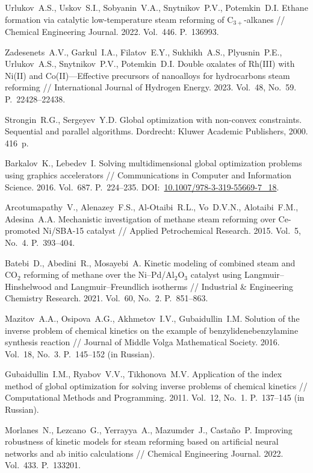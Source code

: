 \documentclass{cmi}
\begin{document}
\begin{biblio_lat}
Urlukov~A.S., Uskov~S.I., Sobyanin~V.A., Snytnikov~P.V., Potemkin~D.I. Ethane formation via catalytic low-temperature steam reforming of C$_{3+}$-alkanes // Chemical Engineering Journal. 2022. Vol.~446. P.~136993.

Zadesenets~A.V., Garkul~I.A., Filatov~E.Y., Sukhikh~A.S., Plyusnin~P.E., Urlukov~A.S., Snytnikov~P.V., Potemkin~D.I. Double oxalates of Rh(III) with Ni(II) and Co(II)---Effective precursors of nanoalloys for hydrocarbons steam reforming // International Journal of Hydrogen Energy. 2023. Vol.~48, No.~59. P.~22428--22438.

Strongin~R.G., Sergeyev~Y.D. Global optimization with non-convex constraints. Sequential and parallel algorithms. Dordrecht: Kluwer Academic Publishers, 2000. 416~p.

Barkalov~K., Lebedev~I. Solving multidimensional global optimization problems using graphics accelerators // Communications in Computer and Information Science. 2016. Vol.~687. P.~224--235. DOI:~\href{http://dx.doi.org/10.1007/978-3-319-55669-7_18}{10.1007/978-3-319-55669-7\_18}.

Arcotumapathy~V., Alenazey~F.S., Al-Otaibi~R.L., Vo~D.V.N., Alotaibi~F.M., Adesina~A.A. Mechanistic investigation of methane steam reforming over Ce-promoted Ni/SBA-15 catalyst // Applied Petrochemical Research. 2015. Vol.~5, No.~4. P.~393--404.

Batebi~D., Abedini~R., Mosayebi~A. Kinetic modeling of combined steam and CO$_2$ reforming of methane over the Ni--Pd/Al$_2$O$_3$ catalyst using Langmuir--Hinshelwood and Langmuir--Freundlich isotherms // Industrial \& Engineering Chemistry Research. 2021. Vol.~60, No.~2. P.~851--863.

Mazitov~A.A., Osipova~A.G., Akhmetov~I.V., Gubaidullin~I.M. Solution of the inverse problem of chemical kinetics on the example of benzylidenebenzylamine synthesis reaction // Journal of Middle Volga Mathematical Society. 2016. Vol.~18, No.~3. P.~145--152 (in Russian).

Gubaidullin~I.M., Ryabov~V.V., Tikhonova~M.V. Application of the index method of global optimization for solving inverse problems of chemical kinetics // Computational Methods and Programming. 2011. Vol.~12, No.~1. P.~137--145 (in Russian).

Morlanes~N., Lezcano~G., Yerrayya~A., Mazumder~J., Castaño~P. Improving robustness of kinetic models for steam reforming based on artificial neural networks and ab initio calculations // Chemical Engineering Journal. 2022. Vol.~433. P.~133201.


\end{biblio_lat}
\end{document}
